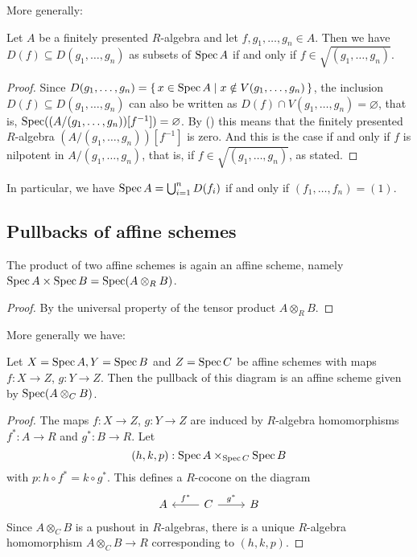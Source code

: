 More generally:

\begin{lemma}%
  Let $A$ be a finitely presented $R$-algebra
  and let $f, g_1, \dots, g_n \in A$.
  Then we have $D(f) \subseteq D(g_1, \dots, g_n)$
  as subsets of $\operatorname{Spec} A$
  if and only if $f \in \sqrt{(g_1, \dots, g_n)}$.
\end{lemma}

\begin{proof}
  Since $D(g_1, \dots, g_n) = \{\, x \in \operatorname{Spec} A \mid x \notin V(g_1, \dots, g_n) \,\}$,
  the inclusion $D(f) \subseteq D(g_1, \dots, g_n)$
  can also be written as
  $D(f) \cap V(g_1, \dots, g_n) = \varnothing$, that is,
  $\operatorname{Spec}((A/(g_1, \dots, g_n))[f^{-1}]) = \varnothing$.
  By ()
  this means that the finitely presented $R$-algebra $(A/(g_1, \dots, g_n))[f^{-1}]$
  is zero.
  And this is the case if and only if $f$ is nilpotent in $A/(g_1, \dots, g_n)$,
  that is, if $f \in \sqrt{(g_1, \dots, g_n)}$, as stated.
\end{proof}

In particular,
we have $\operatorname{Spec} A = \bigcup_{i = 1}^n D(f_i)$
if and only if $(f_1, \dots, f_n) = (1)$.

\subsection{Pullbacks of affine schemes}

\begin{lemma}%
  \label{affine-product}
  The product of two affine schemes is again an affine scheme,
  namely
  $\operatorname{Spec} A \times \operatorname{Spec} B = \operatorname{Spec} (A \otimes_R B)$.
\end{lemma}

\begin{proof}
  By the universal property of the tensor product $A \otimes_R B$.
\end{proof}

More generally we have:

\begin{lemma}%
  \label{affine-fiber-product}
  Let $X=\operatorname{Spec} A,Y=\operatorname{Spec} B$ and $Z=\operatorname{Spec} C$ be affine schemes
  with maps $f:X\to Z$, $g:Y\to Z$.
  Then the pullback of this diagram is an affine scheme given by $\operatorname{Spec} (A\otimes_C B)$.
\end{lemma}

\begin{proof}
  The maps $f:X\to Z$, $g:Y\to Z$ are induced by $R$-algebra homomorphisms $f^*:A\to R$ and $g^*:B\to R$.
  Let
  \[ (h,k,p) : \operatorname{Spec} A \times_{\operatorname{Spec} C} \operatorname{Spec} B \]
  with $p:h\circ f^*=k\circ g^* $.
  This defines a $R$-cocone on the diagram
  \[
    \begin{tikzcd}
      A & C\ar[r,"g^*"]\ar[l,"f^*",swap] & B
    \end{tikzcd}
  \]
  Since $A\otimes_C B$ is a pushout in $R$-algebras,
  there is a unique $R$-algebra homomorphism $A\otimes_C B \to R$ corresponding to $(h,k,p)$.
\end{proof}

